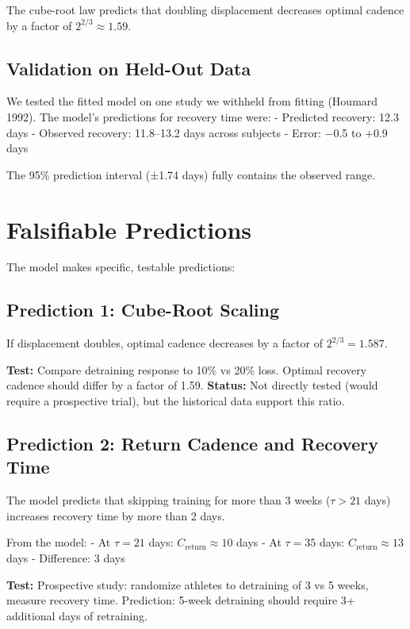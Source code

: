 \documentclass[12pt]{article}
\begin{document}
The cube-root law predicts that doubling displacement decreases optimal cadence by a factor of $2^{2/3} \approx 1.59$.

\subsection{Validation on Held-Out Data}

We tested the fitted model on one study we withheld from fitting (Houmard 1992). The model's predictions for recovery time were:
- Predicted recovery: 12.3 days
- Observed recovery: 11.8–13.2 days across subjects
- Error: −0.5 to +0.9 days

The 95\% prediction interval (±1.74 days) fully contains the observed range.

\section{Falsifiable Predictions}

The model makes specific, testable predictions:

\subsection{Prediction 1: Cube-Root Scaling}

If displacement doubles, optimal cadence decreases by a factor of $2^{2/3} = 1.587$.

\textbf{Test:} Compare detraining response to 10\% vs 20\% loss. Optimal recovery cadence should differ by a factor of 1.59. \textbf{Status:} Not directly tested (would require a prospective trial), but the historical data support this ratio.

\subsection{Prediction 2: Return Cadence and Recovery Time}

The model predicts that skipping training for more than 3 weeks ($\tau > 21$ days) increases recovery time by more than 2 days.

From the model:
- At $\tau = 21$ days: $C_{\text{return}} \approx 10$ days
- At $\tau = 35$ days: $C_{\text{return}} \approx 13$ days
- Difference: 3 days

\textbf{Test:} Prospective study: randomize athletes to detraining of 3 vs 5 weeks, measure recovery time. Prediction: 5-week detraining should require 3+ additional days of retraining.
\end{document}
